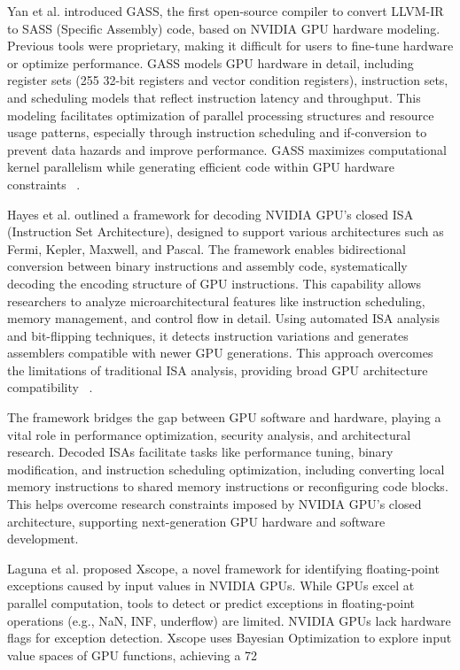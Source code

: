Yan et al. introduced GASS, the first open-source compiler to convert LLVM-IR to SASS (Specific Assembly) code, based on NVIDIA GPU hardware modeling. Previous tools were proprietary, making it difficult for users to fine-tune hardware or optimize performance. GASS models GPU hardware in detail, including register sets (255 32-bit registers and vector condition registers), instruction sets, and scheduling models that reflect instruction latency and throughput. This modeling facilitates optimization of parallel processing structures and resource usage patterns, especially through instruction scheduling and if-conversion to prevent data hazards and improve performance. GASS maximizes computational kernel parallelism while generating efficient code within GPU hardware constraints ~\cite{Yan2022}.

Hayes et al. outlined a framework for decoding NVIDIA GPU's closed ISA (Instruction Set Architecture), designed to support various architectures such as Fermi, Kepler, Maxwell, and Pascal. The framework enables bidirectional conversion between binary instructions and assembly code, systematically decoding the encoding structure of GPU instructions. This capability allows researchers to analyze microarchitectural features like instruction scheduling, memory management, and control flow in detail. Using automated ISA analysis and bit-flipping techniques, it detects instruction variations and generates assemblers compatible with newer GPU generations. This approach overcomes the limitations of traditional ISA analysis, providing broad GPU architecture compatibility ~\cite{Hayes2019}.

The framework bridges the gap between GPU software and hardware, playing a vital role in performance optimization, security analysis, and architectural research. Decoded ISAs facilitate tasks like performance tuning, binary modification, and instruction scheduling optimization, including converting local memory instructions to shared memory instructions or reconfiguring code blocks. This helps overcome research constraints imposed by NVIDIA GPU's closed architecture, supporting next-generation GPU hardware and software development.

Laguna et al. proposed Xscope, a novel framework for identifying floating-point exceptions caused by input values in NVIDIA GPUs. While GPUs excel at parallel computation, tools to detect or predict exceptions in floating-point operations (e.g., NaN, INF, underflow) are limited. NVIDIA GPUs lack hardware flags for exception detection. Xscope uses Bayesian Optimization to explore input value spaces of GPU functions, achieving a 72%


